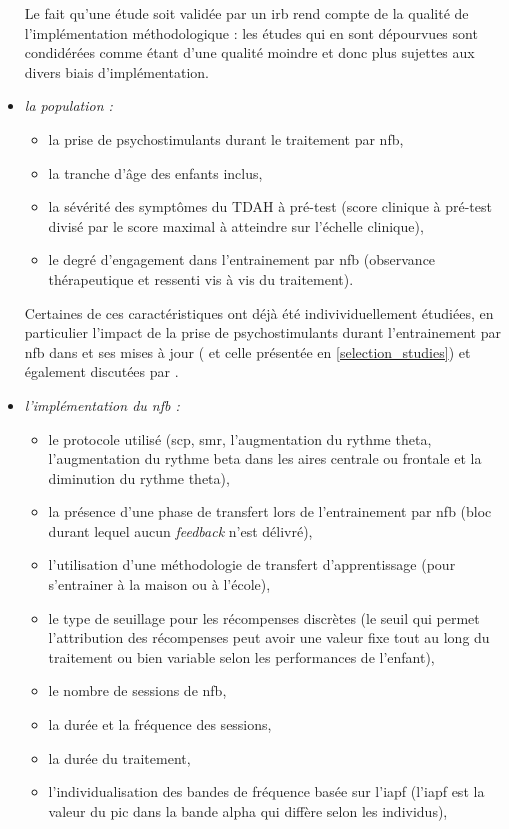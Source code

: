\begin{itemize}
Le fait qu'une étude soit validée par un \gls{irb} rend compte de la qualité de l'implémentation méthodologique : les études qui en sont dépourvues sont
condidérées comme étant d'une qualité moindre et donc plus sujettes aux divers biais d'implémentation.  
\item \emph{la population :} 
    \begin{itemize}
    \item la prise de psychostimulants durant le traitement par \gls{nfb}, 
		\item la tranche d'âge des enfants inclus, 
		\item la sévérité des symptômes du TDAH à pré-test (score clinique à pré-test divisé par le score maximal à atteindre sur l'échelle clinique), 
		\item le degré d'engagement dans l'entrainement par \gls{nfb} (observance thérapeutique et ressenti vis à vis du traitement).
    \end{itemize}
Certaines de ces caractéristiques ont déjà été indivividuellement étudiées, en particulier l'impact de la prise de psychostimulants durant l'entrainement par \gls{nfb} dans
\citet{Cortese2016} et ses mises à jour (\citep{Bussalb2019clinical} et celle présentée en \ref{selection_studies}) et également discutées par \citet{VanDoren2017}.
\item \emph{l'implémentation du \gls{nfb} :} 
    \begin{itemize}
    \item le protocole utilisé (\gls{scp}, \gls{smr}, l'augmentation du rythme theta, l'augmentation du rythme beta dans les aires centrale ou frontale 
    et la diminution du rythme theta), 
		\item la présence d'une phase de transfert lors de l'entrainement par \gls{nfb} (bloc durant lequel aucun \textit{feedback} n'est délivré), 
		\item l'utilisation d'une méthodologie de transfert d'apprentissage (pour s'entrainer à la maison ou à l'école), 
    \item le type de seuillage pour les récompenses discrètes (le seuil qui permet l'attribution des récompenses peut avoir une valeur fixe tout au long du traitement ou bien variable
		selon les performances de l'enfant), 
		\item le nombre de sessions de \gls{nfb}, 
		\item la durée et la fréquence des sessions, 
		\item la durée du traitement, 
		\item l'individualisation des bandes de fréquence basée sur l'\gls{iapf} (l'\gls{iapf} est la valeur du pic dans la bande alpha qui diffère selon les individus), 

\end{itemize}
\end{itemize}
